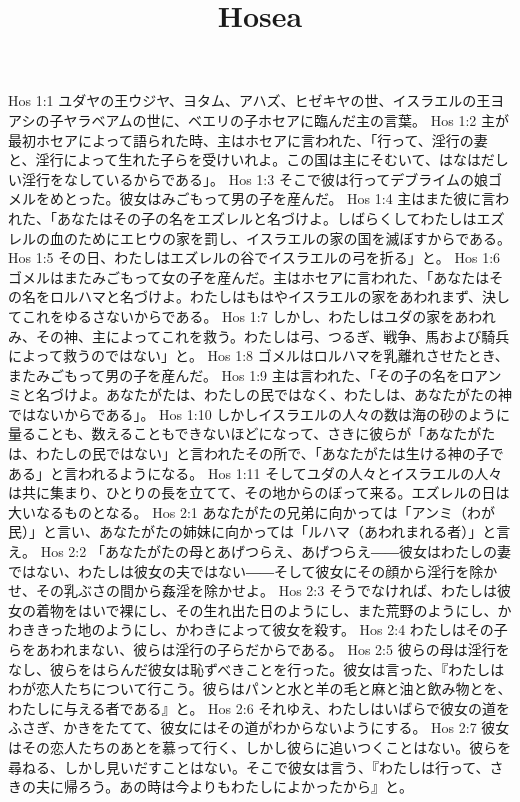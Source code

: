 

\title{Hosea}

Hos 1:1  ユダヤの王ウジヤ、ヨタム、アハズ、ヒゼキヤの世、イスラエルの王ヨアシの子ヤラベアムの世に、ベエリの子ホセアに臨んだ主の言葉。
Hos 1:2  主が最初ホセアによって語られた時、主はホセアに言われた、「行って、淫行の妻と、淫行によって生れた子らを受けいれよ。この国は主にそむいて、はなはだしい淫行をなしているからである」。
Hos 1:3  そこで彼は行ってデブライムの娘ゴメルをめとった。彼女はみごもって男の子を産んだ。
Hos 1:4  主はまた彼に言われた、「あなたはその子の名をエズレルと名づけよ。しばらくしてわたしはエズレルの血のためにエヒウの家を罰し、イスラエルの家の国を滅ぼすからである。
Hos 1:5  その日、わたしはエズレルの谷でイスラエルの弓を折る」と。
Hos 1:6  ゴメルはまたみごもって女の子を産んだ。主はホセアに言われた、「あなたはその名をロルハマと名づけよ。わたしはもはやイスラエルの家をあわれまず、決してこれをゆるさないからである。
Hos 1:7  しかし、わたしはユダの家をあわれみ、その神、主によってこれを救う。わたしは弓、つるぎ、戦争、馬および騎兵によって救うのではない」と。
Hos 1:8  ゴメルはロルハマを乳離れさせたとき、またみごもって男の子を産んだ。
Hos 1:9  主は言われた、「その子の名をロアンミと名づけよ。あなたがたは、わたしの民ではなく、わたしは、あなたがたの神ではないからである」。
Hos 1:10  しかしイスラエルの人々の数は海の砂のように量ることも、数えることもできないほどになって、さきに彼らが「あなたがたは、わたしの民ではない」と言われたその所で、「あなたがたは生ける神の子である」と言われるようになる。
Hos 1:11  そしてユダの人々とイスラエルの人々は共に集まり、ひとりの長を立てて、その地からのぼって来る。エズレルの日は大いなるものとなる。
Hos 2:1  あなたがたの兄弟に向かっては「アンミ（わが民）」と言い、あなたがたの姉妹に向かっては「ルハマ（あわれまれる者）」と言え。
Hos 2:2  「あなたがたの母とあげつらえ、あげつらえ――彼女はわたしの妻ではない、わたしは彼女の夫ではない――そして彼女にその顔から淫行を除かせ、その乳ぶさの間から姦淫を除かせよ。
Hos 2:3  そうでなければ、わたしは彼女の着物をはいで裸にし、その生れ出た日のようにし、また荒野のようにし、かわききった地のようにし、かわきによって彼女を殺す。
Hos 2:4  わたしはその子らをあわれまない、彼らは淫行の子らだからである。
Hos 2:5  彼らの母は淫行をなし、彼らをはらんだ彼女は恥ずべきことを行った。彼女は言った、『わたしはわが恋人たちについて行こう。彼らはパンと水と羊の毛と麻と油と飲み物とを、わたしに与える者である』と。
Hos 2:6  それゆえ、わたしはいばらで彼女の道をふさぎ、かきをたてて、彼女にはその道がわからないようにする。
Hos 2:7  彼女はその恋人たちのあとを慕って行く、しかし彼らに追いつくことはない。彼らを尋ねる、しかし見いだすことはない。そこで彼女は言う、『わたしは行って、さきの夫に帰ろう。あの時は今よりもわたしによかったから』と。
